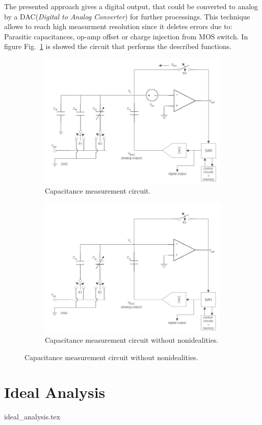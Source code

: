 \documentclass[
	letterpaper,
	a4paper,
	cleardoublepage=empty,
	headings=twolinechapter,
	numbers=autoenddot,
]{report}
\newcommand{\Fig}[0]{Fig.}
\begin{document}
	The presented approach gives a digital output, that could be converted to analog by a DAC(\textit{Digital to Analog Converter}) for further processings. This technique allows to reach high measurment resolution since it deletes errors due to: Parasitic capacitances, op-amp offset or charge injection from MOS switch. In figure \Fig~\ref{fig:CompleteCircuit} is showed the circuit that performs the described functions.
	\begin{figure}[h]
		\centering
		\begin{subfigure}{.5\textwidth}
			\centering
			\includegraphics[width=0.6\linewidth]{ImageFiles/CompleteCircuit}
			\caption{Capacitance measurement circuit.}
			\label{fig:CompleteCircuit}
		\end{subfigure}%
		\begin{subfigure}{.5\textwidth}
			\centering
			\includegraphics[width=0.6\linewidth]{ImageFiles/IdealCircuit}
			\caption{Capacitance measurement circuit without nonidealities.}
			\label{fig:IdealCircuit}
		\end{subfigure}
	\end{figure}
	\section*{Ideal Analysis}
	
	{ideal_analysis.tex}
	
\end{document}
